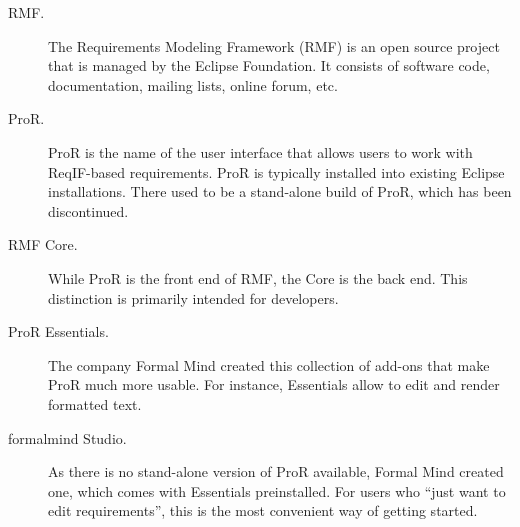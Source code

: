 \begin{description}
\item[RMF.] The Requirements Modeling Framework (RMF) is an open source project that is managed by the Eclipse Foundation.  It consists of software code, documentation, mailing lists, online forum, etc.
\item[ProR.] ProR is the name of the user interface that allows users to work with ReqIF-based requirements.  ProR is typically installed into existing Eclipse installations.  There used to be a stand-alone build of ProR, which has been discontinued.
\item[RMF Core.] While ProR is the front end of RMF, the Core is the back end.  This distinction is primarily intended for developers.
\item[ProR Essentials.] The company Formal Mind created this collection of add-ons that make ProR much more usable.  For instance, Essentials allow to edit and render formatted text.
\item[formalmind Studio.] As there is no stand-alone version of ProR available, Formal Mind created one, which comes with Essentials preinstalled.  For users who ``just want to edit requirements'', this is the most convenient way of getting started.
\end{description}

